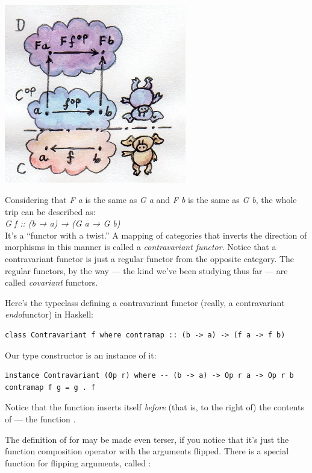 \includegraphics[width=3.12500in]{images/contravariant.jpg}

Considering that \emph{F a} is the same as \emph{G a} and \emph{F b} is
the same as \emph{G b}, the whole trip can be described as:\\
\emph{G f :: (b → a) → (G a → G b)}\\
It's a ``functor with a twist.'' A mapping of categories that inverts
the direction of morphisms in this manner is called a
\emph{contravariant functor}. Notice that a contravariant functor is
just a regular functor from the opposite category. The regular functors,
by the way --- the kind we've been studying thus far --- are called
\emph{covariant} functors.

Here's the typeclass defining a contravariant functor (really, a
contravariant \emph{endo}functor) in Haskell:

\begin{verbatim}
class Contravariant f where contramap :: (b -> a) -> (f a -> f b)
\end{verbatim}

Our type constructor  is an instance of it:

\begin{verbatim}
instance Contravariant (Op r) where -- (b -> a) -> Op r a -> Op r b contramap f g = g . f
\end{verbatim}

Notice that the function  inserts itself \emph{before} (that
is, to the right of) the contents of  --- the function
.

The definition of  for  may be made even
terser, if you notice that it's just the function composition operator
with the arguments flipped. There is a special function for flipping
arguments, called :

